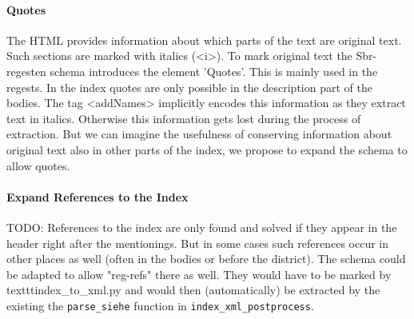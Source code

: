 \paragraph{Quotes}
The HTML provides information about which parts of the text are original text. Such sections are marked with italics (<i>). To mark original text the Sbr-regesten schema introduces the element 'Quotes'. This is mainly used in the regests. In the index quotes are only possible in the description part of the bodies. The tag <addNames> implicitly encodes this information as they extract text in italics. Otherwise this information gets lost during the process of extraction. But we can imagine the usefulness of conserving information about original text also in other parts of the index, we propose to expand the schema to allow quotes.

\paragraph{Expand References to the Index}
TODO: References to the index are only found and solved if they appear in the header right after the mentionings. But in some cases such references occur in other places as well (often in the bodies or before the district). The schema could be adapted to allow "reg-refs" there as well. They would have to be marked by texttt{index\_to\_xml.py} and would then (automatically) be extracted by the existing the \texttt{parse\_siehe} function in \texttt{index\_xml\_postprocess}.